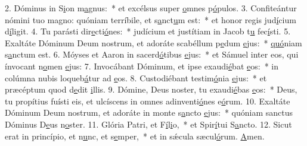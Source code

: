 2. Dóminus in S\uline{i}on m\uline{a}gnus:~* et excélsus super \uline{o}mnes p\uline{ó}pulos.
3. Confiteántur nómini tuo magno: quóniam terríbile, et s\uline{a}nct\uline{u}m est:~* et honor regis jud\uline{í}cium d\uline{í}ligit.
4. Tu parásti dir\uline{e}cti\uline{ó}nes:~* judícium et justítiam in Jacob t\uline{u} fec\uline{í}sti.
5. Exaltáte Dóminum Deum nostrum, et adoráte scabéllum p\uline{e}dum \uline{e}jus:~* \uline{quó}niam s\uline{a}nctum est.
6. Móyses et Aaron in sacerd\uline{ó}tibus \uline{e}jus:~* et Sámuel inter eos, qui ínvocant n\uline{o}men \uline{e}jus:
7. Invocábant Dóminum, et ipse exaudi\uline{é}bat \uline{e}os:~* in colúmna nubis loqueb\uline{á}tur ad \uline{e}os.
8. Custodiébant testim\uline{ó}nia \uline{e}jus:~* et præcéptum quod d\uline{e}dit \uline{i}llis.
9. Dómine, Deus noster, tu exaudi\uline{é}bas \uline{e}os:~* Deus, tu propítius fuísti eis, et ulcíscens in omnes adinventi\uline{ó}nes e\uline{ó}rum.
10. Exaltáte Dóminum Deum nostrum, et adoráte in monte s\uline{a}ncto \uline{e}jus:~* quóniam sanctus Dóminus D\uline{e}us n\uline{o}ster.
11. Glória Patri, et F\uline{í}l\uline{i}o,~* et Spir\uline{í}tui S\uline{a}ncto.
12. Sicut erat in princípio, et n\uline{u}nc, et s\uline{e}mper,~* et in sǽcula sæcul\uline{ó}rum. \uline{A}men.
